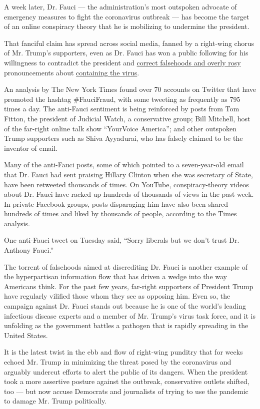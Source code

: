 A week later, Dr. Fauci --- the administration's most outspoken advocate
of emergency measures to fight the coronavirus outbreak --- has become
the target of an online conspiracy theory that he is mobilizing to
undermine the president.

That fanciful claim has spread across social media, fanned by a
right-wing chorus of Mr. Trump's supporters, even as Dr. Fauci has won a
public following for his willingness to contradict the president and
\href{https://www.nytimes.com/2020/03/23/us/politics/coronavirus-trump-fauci.html}{correct
falsehoods and overly rosy} pronouncements about
\href{https://www.nytimes.com/interactive/2020/world/coronavirus-maps.html}{containing
the virus}.

An analysis by The New York Times found over 70 accounts on Twitter that
have promoted the hashtag \#FauciFraud, with some tweeting as frequently
as 795 times a day. The anti-Fauci sentiment is being reinforced by
posts from Tom Fitton, the president of Judicial Watch, a conservative
group; Bill Mitchell, host of the far-right online talk show ``YourVoice
America''; and other outspoken Trump supporters such as Shiva Ayyadurai,
who has falsely claimed to be the inventor of email.

Many of the anti-Fauci posts, some of which pointed to a seven-year-old
email that Dr. Fauci had sent praising Hillary Clinton when she was
secretary of State, have been retweeted thousands of times. On YouTube,
conspiracy-theory videos about Dr. Fauci have racked up hundreds of
thousands of views in the past week. In private Facebook groups, posts
disparaging him have also been shared hundreds of times and liked by
thousands of people, according to the Times analysis.

One anti-Fauci tweet on Tuesday said, ``Sorry liberals but we don't
trust Dr. Anthony Fauci.''

The torrent of falsehoods aimed at discrediting Dr. Fauci is another
example of the hyperpartisan information flow that has driven a wedge
into the way Americans think. For the past few years, far-right
supporters of President Trump have regularly vilified those whom they
see as opposing him. Even so, the campaign against Dr. Fauci stands out
because he is one of the world's leading infectious disease experts and
a member of Mr. Trump's virus task force, and it is unfolding as the
government battles a pathogen that is rapidly spreading in the United
States.

It is the latest twist in the ebb and flow of right-wing punditry that
for weeks echoed Mr. Trump in minimizing the threat posed by the
coronavirus and arguably undercut efforts to alert the public of its
dangers. When the president took a more assertive posture against the
outbreak, conservative outlets shifted, too --- but now accuse Democrats
and journalists of trying to use the pandemic to damage Mr. Trump
politically.

